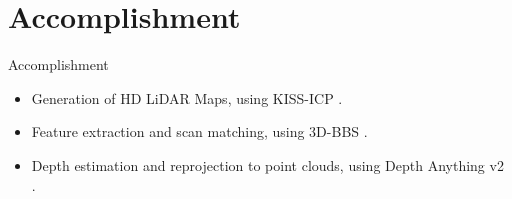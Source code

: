 \section{Accomplishment}

\begin{frame}{Accomplishment}
\begin{itemize}
    \item Generation of HD LiDAR Maps, using KISS-ICP \cite{Vizzo_2023}.
    \item Feature extraction and scan matching, using 3D-BBS \cite{aoki20243dbbsgloballocalization3d}.
    \item Depth estimation and reprojection to point clouds, using Depth Anything v2 \cite{yang2024depthv2}.
\end{itemize}
\end{frame}
